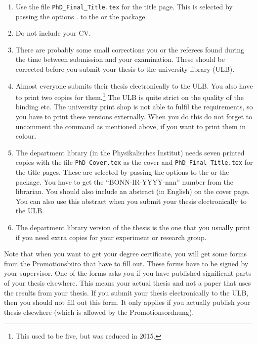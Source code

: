 \begin{enumerate}
\item Use the file \texttt{PhD\_Final\_Title.tex} for the title page.
  This is selected by passing the options .
  to the  or the  package.
\item Do not include your CV\@.
\item There are probably some small corrections you or the referees
  found during the time between submission and your examination. These
  should be corrected before you submit your thesis to the university
  library (ULB).
\item Almost everyone submits their thesis electronically to the ULB\@.
  You also have to print two copies for them.\footnote{%
  This used to be five, but was reduced in 2015.}
  The ULB is quite strict on the quality of the binding etc. The university
  print shop is not able to fulfil the requirements, so you have to print
  these versions externally. When you do this do not forget to
  uncomment the  command as mentioned above, if you
  want to print them in colour.
\item The department library
  (in the Physikalisches Institut) needs seven printed copies with the file
  \texttt{PhD\_Cover.tex} as the cover and
  \texttt{PhD\_Final\_Title.tex} for the title pages.
  These are selected by passing the options 
  to the  or the  package.
  You have to get
  the \enquote{BONN-IR-YYYY-nnn} number from the librarian. You
  should also include an abstract (in English) on the cover page. You
  can also use this abstract when you submit your thesis
  electronically to the ULB\@.
\item The department library version of the thesis is the one that you usually print if
  you need extra copies for your experiment or research group.
\end{enumerate}

Note that when you want to get your degree certificate, you will get
some forms from the \foreignlanguage{ngerman}{Promotionsbüro} that have
to fill out.
These forms have to be signed by your supervisor.
One of the forms asks you if you have published significant parts of your
thesis elsewhere.
This means your actual thesis and not a paper that uses the results from your thesis.
If you submit your thesis electronically to the ULB, then you should not fill out this form.
It only applies if you actually publish your thesis elsewhere
(which is allowed by the \foreignlanguage{ngerman}{Promotionsordnung}).
